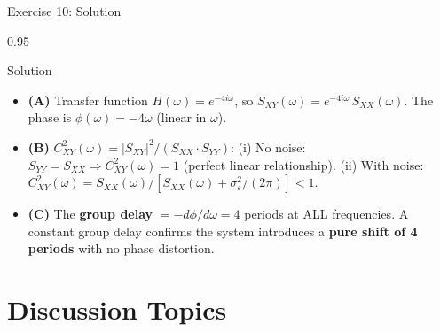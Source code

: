 \documentclass[9pt, aspectratio=169, t]{beamer}
\begin{document}
\begin{frame}{Exercise 10: Solution}
    \begin{cminipage}{0.95\textwidth}
    \begin{exampleblock}{Solution}
        {\small
        \begin{itemize}\setlength{\itemsep}{3pt}
            \item \textcolor{MainBlue}{\textbf{(A)}} Transfer function $H(\omega) = e^{-4i\omega}$, so $S_{XY}(\omega) = e^{-4i\omega}\,S_{XX}(\omega)$.
                The phase is $\phi(\omega) = -4\omega$ (linear in $\omega$).
            \item \textcolor{MainBlue}{\textbf{(B)}} $C^2_{XY}(\omega) = |S_{XY}|^2/(S_{XX} \cdot S_{YY})$:
                (i) No noise: $S_{YY} = S_{XX} \Rightarrow C^2_{XY}(\omega) = 1$ (perfect linear relationship).
                (ii) With noise: $C^2_{XY}(\omega) = S_{XX}(\omega)/[S_{XX}(\omega) + \sigma^2_\varepsilon/(2\pi)] < 1$.
            \item \textcolor{MainBlue}{\textbf{(C)}} The \textbf{group delay} $= -d\phi/d\omega = 4$ periods at ALL frequencies. A constant group delay confirms the system introduces a \textbf{pure shift of 4 periods} with no phase distortion.
        \end{itemize}
        }
    \end{exampleblock}
    \end{cminipage}
\end{frame}

\section{Discussion Topics}
\end{document}
